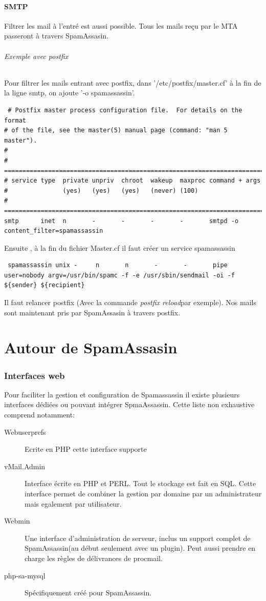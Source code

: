 \documentclass[a4paper,11pt]{article}
\begin{document}
\subsection{SMTP}

Filtrer les mail à l'entré est aussi possible. Tous les mails reçu
par le MTA passeront à travers SpamAssasin.
        
\paragraph{Exemple avec postfix} Pour filtrer les mails entrant avec postfix,
dans '/etc/postfix/master.cf' à la fin de la ligne smtp, on ajoute '-o spamassassin'. 
\begin{lstlisting}
 # Postfix master process configuration file.  For details on the format
# of the file, see the master(5) manual page (command: "man 5 master").
#
# ==========================================================================
# service type  private unpriv  chroot  wakeup  maxproc command + args
#               (yes)   (yes)   (yes)   (never) (100)
# ==========================================================================
smtp      inet  n       -       -       -       -       smtpd -o content_filter=spamassassin
\end{lstlisting}
Ensuite , à la fin du fichier Master.cf il faut créer un service spamassassin
\begin{lstlisting}
 spamassassin unix -     n       n       -       -       pipe user=nobody argv=/usr/bin/spamc -f -e /usr/sbin/sendmail -oi -f ${sender} ${recipient}
\end{lstlisting}

Il faut relancer postfix (Avec la commande \emph{postfix reload}par exemple). Nos mails sont maintenant pris
par SpamAssasin à travers postfix. 
\part{Autour de SpamAssasin}

\section{Interfaces web}
Pour faciliter la gestion et configuration de Spamassassin il existe plusieurs interfaces dédiées ou pouvant intégrer 
SpmaAssassin. Cette liste non exhaustive comprend notamment:

\begin{description}
 \item [Webuserprefs] Ecrite en PHP cette interface supporte 
 \item [vMail.Admin] Interface écrite en PHP et PERL. Tout le stockage est fait en SQL. Cette interface permet 
 de combiner la gestion par domaine par un administrateur mais egalement par utilisateur.
 \item [Webmin] Une interface d'administration de serveur, inclus un support complet de SpamAssassin(au début seulement avec un plugin).
 Peut aussi prendre en charge les règles de délivrances de procmail. 
 \item [php-sa-mysql] Spécifiquement créé pour SpamAssassin. 
 
\end{description}
\end{document}
